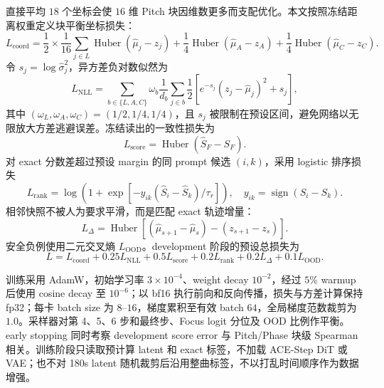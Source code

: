 \documentclass{article}
\begin{document}
直接平均 $18$ 个坐标会使 $16$ 维 Pitch 块因维数更多而支配优化。本文按照冻结距离权重定义块平衡坐标损失：
\begin{equation}
L_{\mathrm{coord}}={}
\frac{1}{2} \times \frac{1}{16}\sum_{j\in L}
\operatorname{Huber}(\hat{\mu}_j-z_j)
+\frac{1}{4}\operatorname{Huber}(\hat{\mu}_A-z_A)
+\frac{1}{4}\operatorname{Huber}(\hat{\mu}_C-z_C).
\label{eq:block_balanced_loss}
\end{equation}
令 $s_j=\log\hat{\sigma}_j^2$，异方差负对数似然为
\begin{equation}
L_{\mathrm{NLL}}=
\sum_{b\in\{L,A,C\}}\omega_b\frac{1}{d_b}\sum_{j\in b}
\frac{1}{2}\left[e^{-s_j}(z_j-\hat{\mu}_j)^2+s_j\right],
\end{equation}
其中 $(\omega_L,\omega_A,\omega_C)=(1/2,1/4,1/4)$，且 $s_j$ 被限制在预设区间，避免网络以无限放大方差逃避误差。冻结读出的一致性损失为
\begin{equation}
L_{\mathrm{score}}=\operatorname{Huber}(\hat{S}_F-S_F).
\end{equation}
对 exact 分数差超过预设 margin 的同 prompt 候选 $(i,k)$，采用 logistic 排序损失
\begin{equation}
L_{\mathrm{rank}}=\log\left(1+
\exp\left[-y_{ik}(\hat{S}_i-\hat{S}_k)/\tau_r\right]\right),
\quad y_{ik}=\operatorname{sign}(S_i-S_k).
\end{equation}
相邻快照不被人为要求平滑，而是匹配 exact 轨迹增量：
\begin{equation}
L_{\Delta}=\operatorname{Huber}\left[
(\hat{\mu}_{s+1}-\hat{\mu}_s)-(z_{s+1}-z_s)\right].
\end{equation}
安全负例使用二元交叉熵 $L_{\mathrm{OOD}}$。development 阶段的预设总损失为
\begin{equation}
L=L_{\mathrm{coord}}+0.25L_{\mathrm{NLL}}+0.5L_{\mathrm{score}}
+0.2L_{\mathrm{rank}}+0.2L_{\Delta}+0.1L_{\mathrm{OOD}}.
\label{eq:ltsn_total_loss}
\end{equation}

训练采用 AdamW，初始学习率 $3\times10^{-4}$、weight decay $10^{-2}$，经过 $5\%$ warmup 后使用 cosine decay 至 $10^{-6}$；以 bf16 执行前向和反向传播，损失与方差计算保持 fp32；每卡 batch size 为 $8$--$16$，梯度累积至有效 batch $64$，全局梯度范数裁剪为 $1.0$。采样器对第 4、5、6 步和最终步、Focus logit 分位及 OOD 比例作平衡。early stopping 同时考察 development score error 与 Pitch/Phase 块级 Spearman 相关。训练阶段只读取预计算 latent 和 exact 标签，不加载 ACE-Step DiT 或 VAE；也不对 180s latent 随机裁剪后沿用整曲标签，不以打乱时间顺序作为数据增强。
\end{document}
